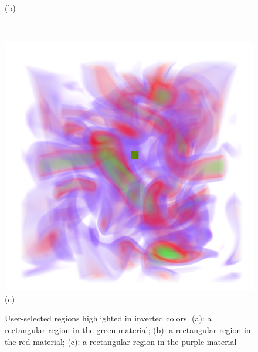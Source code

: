 \documentclass[twoside,twocolumn,10pt]{article}
\begin{document}
\begin{figure}
\begin{minipage}{.16\textwidth}
		(b)
	\end{minipage}~
	\begin{minipage}{.16\textwidth}
		\centering
		\includegraphics[width=1\linewidth]{crop/vortex_selection_purple}
		(c)
	\end{minipage}
	\caption{User-selected regions highlighted in inverted colors. (a): a rectangular region in the green material; (b): a rectangular region in the red material; (c): a rectangular region in the purple material}
	\label{fig:vortex_features}
\end{figure}
\end{document}
